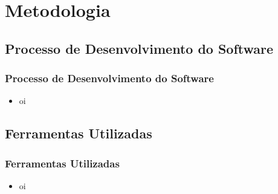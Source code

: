 \section{Metodologia}

\subsection{Processo de Desenvolvimento do Software}
\frame
{
\frametitle{Processo de Desenvolvimento do Software}
\begin{itemize}
	\item oi
\end{itemize}
}

\subsection{Ferramentas Utilizadas}
\frame
{
\frametitle{Ferramentas Utilizadas}
\begin{itemize}
	\item oi
\end{itemize}
}
